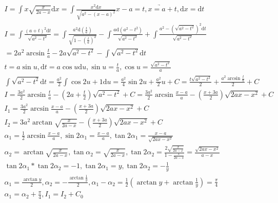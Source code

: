 \documentclass{article}
\begin{document}
\begin{align*}
    I = \int x\sqrt{\frac{x}{2a-x}}\mathrm{d}x = \int \frac{x^2\mathrm{d}x}{\sqrt{a^2-(x-a)^2}} \underrightarrow{x-a=t,x=a+t,\mathrm{d}x=\mathrm{d}t} \\
    I = \int \frac{(a+t)^2\mathrm{d}t}{\sqrt{a^2-t^2}} = \int \frac{a^2\mathrm{d}(\frac{t}{a})}{\sqrt{1-(\frac{t}{a})^2}} - \int \frac{a\mathrm{d}(a^2-t^2)}{\sqrt{a^2-t^2}} + \int \frac{a^2 - (\sqrt{a^2-t^2})^2\mathrm{d}t}{\sqrt{a^2-t^2}} \\
    = 2a^2 \arcsin \frac{t}{a} - 2a\sqrt{a^2-t^2} - \int \sqrt{a^2-t^2} \mathrm{d}t \\
    t = a\sin u, \mathrm{d}t = a\cos u\mathrm{d}u, \sin u = \frac{t}{a}, \cos u = \frac{\sqrt{a^2-t^2}}{a}\\
    \int \sqrt{a^2-t^2}\mathrm{d}t = \frac{a^2}{2}\int  \cos 2u + 1\mathrm{d}u = \frac{a^2}{4} \sin 2u + \frac{a^2}{2}u + C = \frac{t\sqrt{a^2-t^2}}{2} + \frac{a^2\arcsin \frac{t}{a}}{2} + C\\
    I = \frac{3a^2}{2}\arcsin \frac{t}{a} - (2a+\frac{t}{2})\sqrt{a^2-t^2} + C = \frac{3a^2}{2}\arcsin \frac{x-a}{a} - (\frac{x+3a}{2})\sqrt{2ax-x^2} + C \\
    I_{1} = \frac{3a^2}{2}\arcsin \frac{x-a}{a} - (\frac{x+3a}{2})\sqrt{2ax-x^2} + C \\
    I_{2} = 3a^2\arctan \sqrt{\frac{x}{2a-x}} - (\frac{x+3a}{2})\sqrt{2ax-x^2} + C \\
    \alpha_{1} = \frac{1}{2}\arcsin \frac{x-a}{a}, \sin 2\alpha_{1} = \frac{x-a}{a}, \tan 2\alpha_{1} = \frac{x-a}{\sqrt{2ax-x^2}}\\
    \alpha_{2} = \arctan \sqrt{\frac{x}{2a-x}}, \tan \alpha_{2} = \sqrt{\frac{x}{2a-x}}, \tan 2\alpha_{2} = \frac{2\sqrt{\frac{x}{2a-x}}}{1-\frac{x}{2a-x}} = \frac{\sqrt{2ax-x^2}}{a-x} \\
    \tan 2\alpha_{1} * \tan 2\alpha_{2} = -1, \tan 2\alpha_{1}=y,\tan 2\alpha_{2} = -\frac{1}{y}\\
    \alpha_{1} = \frac{\arctan y}{2}, \alpha_{2} = -\frac{\arctan \frac{1}{y}}{2}, \alpha_{1}-\alpha_{2} = \frac{1}{2}\left(\arctan y + \arctan \frac{1}{y}\right) = \frac{\pi}{4} \\
    \alpha_{1} = \alpha_{2} + \frac{\pi}{4}, I_{1} = I_{2} + C_{0} \\
\end{align*}
\end{document}
